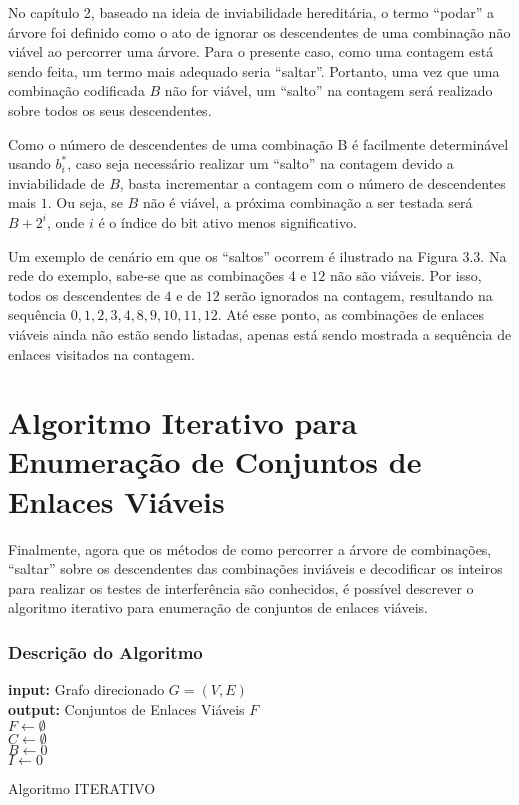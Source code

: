 No capítulo 2, baseado na ideia de inviabilidade hereditária, o termo “podar” a árvore foi definido como o ato de ignorar os descendentes de uma combinação não viável ao percorrer uma árvore. Para o presente caso, como uma contagem está sendo feita, um termo mais adequado seria “saltar”. Portanto, uma vez que uma combinação codificada $B$ não for viável, um “salto” na contagem será realizado sobre todos os seus descendentes.

Como o número de descendentes de uma combinação B é facilmente determinável usando $b_i^*$, caso seja necessário realizar um “salto” na contagem devido a inviabilidade de $B$, basta incrementar a contagem com o número de descendentes mais $1$. Ou seja, se $B$ não é viável, a próxima combinação a ser testada será $B + 2^i$, onde $i$ é o índice do bit ativo menos significativo.


Um exemplo de cenário em que os “saltos” ocorrem é ilustrado na Figura 3.3. Na rede do exemplo, sabe-se que as combinações $4$ e $12$ não são viáveis. Por isso, todos os descendentes de $4$ e de $12$ serão ignorados na contagem, resultando na sequência $0, 1, 2, 3, 4, 8, 9, 10, 11, 12$. Até esse ponto, as combinações de enlaces viáveis ainda não estão sendo listadas, apenas está sendo mostrada a sequência de enlaces visitados na contagem.

\section{Algoritmo Iterativo para Enumeração de Conjuntos de Enlaces Viáveis}

Finalmente, agora que os métodos de como percorrer a árvore de combinações, “saltar” sobre os descendentes das combinações inviáveis e decodificar os inteiros para realizar os testes de interferência são conhecidos, é possível descrever o algoritmo iterativo para enumeração de conjuntos de enlaces viáveis.

\subsubsection{Descrição do Algoritmo}

\begin{algorithm}[h]
	\SetVline
	{\bf input:} Grafo direcionado $G=(V,E)$\\
	{\bf output:} Conjuntos de Enlaces Viáveis $F$\\
	$F \leftarrow \emptyset$\\
	$C \leftarrow \emptyset$\\
	$B \leftarrow 0$\\
	$I \leftarrow 0$\\
\caption{Algoritmo ITERATIVO}
\label{alg:iterativo}
\end{algorithm}

